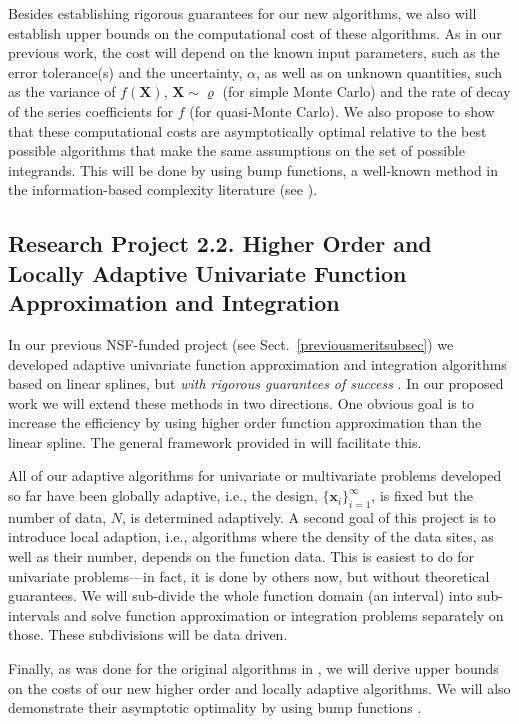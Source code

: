 \documentclass[11pt]{NSFamsart}
\newcommand{\bx}{{\boldsymbol{x}}}
\newcommand{\bX}{{\boldsymbol{X}}}
\newcommand{\desinf}{\{\bx_i\}_{i=1}^{\infty}}
\begin{document}
Besides establishing rigorous guarantees for our new algorithms, we also will establish upper bounds on the computational cost of these algorithms.  As in our previous work, the cost will depend on the known input parameters, such as the error tolerance(s) and the uncertainty, $\alpha$, as well as on unknown quantities, such as the variance of $f(\bX)$, $\bX \sim \varrho$ (for simple Monte Carlo) and the rate of decay of the series coefficients for $f$ (for quasi-Monte Carlo).  We also propose to show that these computational costs are asymptotically optimal relative to the best possible algorithms that make the same assumptions on the set of possible integrands.  This will be done by using bump functions, a well-known method in the information-based complexity literature (see \cite{Nov88,TraWasWoz88}).

\subsection*{Research Project 2.2. Higher Order and Locally Adaptive Univariate Function Approximation and Integration}\label{Higherordersubsec}
In our previous NSF-funded project (see Sect.\ \ref{previousmeritsubsec}) we developed adaptive univariate function approximation and integration algorithms based on linear splines, but \emph{with rigorous guarantees of success} \citep{HicEtal14b}.  In our proposed work we will extend these methods in two directions.  One obvious goal is to increase the efficiency by using higher order function approximation than the linear spline. The general framework provided in \cite{HicEtal14b} will facilitate this.

All of our adaptive algorithms for univariate or multivariate problems developed so far have been globally adaptive, i.e., the design, $\desinf$, is fixed but the number of data, $N$, is determined adaptively.  A second goal of this project  is to introduce local adaption, i.e., algorithms where the density of the data sites, as well as their number, depends on the function data.  This is easiest to do for univariate problems---in fact, it is done by others now, but without theoretical guarantees.  We will sub-divide the whole function domain (an interval) into sub-intervals and solve function approximation or integration problems separately on those.  These subdivisions will be data driven.

Finally, as was done for the original algorithms in \citep{HicEtal14b}, we will derive upper bounds on the costs of our new higher order and locally adaptive algorithms.  We will also demonstrate their asymptotic optimality by using bump functions \cite{Nov88,TraWasWoz88}.
\end{document}
